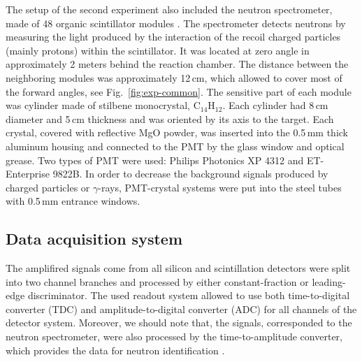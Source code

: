 The setup of the second experiment also included the neutron spectrometer, made of 48 organic scintillator modules \cite{Bezbakh:2018}.
The spectrometer detects neutrons by measuring the light produced by the interaction of the recoil charged particles (mainly protons) within the scintillator.
It was located at zero angle in approximately 2 meters behind the reaction chamber.
The distance between the neighboring modules was approximately 12\,cm, which allowed to cover most of the forward angles, see Fig.\ \ref{fig:exp-common}.
The sensitive part of each module was cylinder made of stilbene monocrystal, C$_{14}$H$_{12}$. 
Each cylinder had 8\,cm diameter and 5\,cm thickness and was oriented by its axis to the target.
Each crystal, covered with reflective MgO powder, was inserted into the 0.5\,mm thick aluminum housing and connected to the PMT by the glass window and optical grease.
Two types of PMT were used: Philips Photonics XP 4312 and ET-Enterprise 9822B. 
In order to decrease the background signals produced by charged particles or $\gamma$-rays, PMT-crystal systems were put into the steel tubes with 0.5\,mm entrance windows.

\subsection{Data acquisition system}

The amplifired signals come from all silicon and scintillation detectors were split into two channel branches and processed by either constant-fraction or leading-edge discriminator. 
The used readout system allowed to use both time-to-digital converter (TDC) and amplitude-to-digital converter (ADC) for all channels of the detector system.
Moreover, we should note that, the signals, corresponded to the neutron spectrometer, were also processed by the time-to-amplitude converter, which provides the data for neutron identification \cite{Bezbakh:2018}.

